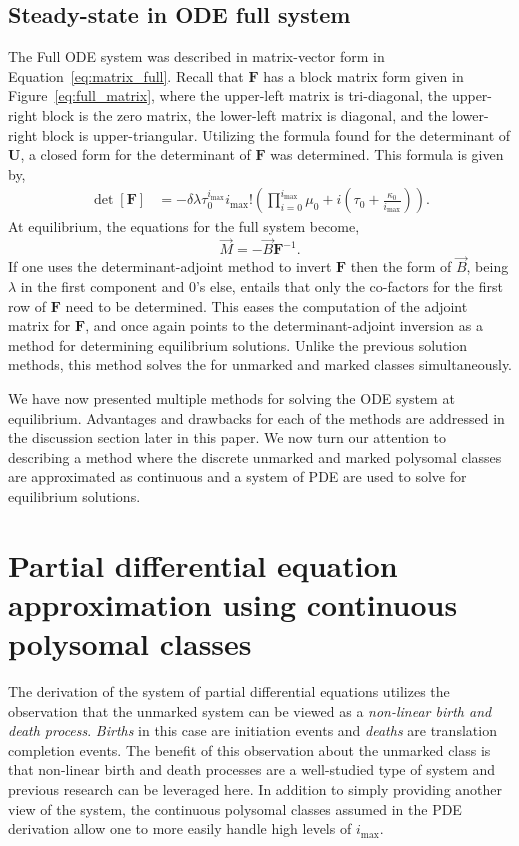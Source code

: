 \documentclass[review]{elsarticle}
\newcommand{\imax}{\ensuremath{i_{\max}}\xspace}
\let\bs\boldsymbol
\begin{document}
\subsection{Steady-state in ODE full system}
The Full ODE system was described in matrix-vector form in Equation~\ref{eq:matrix_full}.
Recall that $\bs{F}$ has a block matrix form given in Figure~\ref{eq:full_matrix}, where the upper-left matrix is tri-diagonal, the upper-right block is the zero matrix, the lower-left matrix is diagonal, and the lower-right block is upper-triangular.
Utilizing the formula found for the determinant of $\bs{U}$, a closed form for the determinant of $\bs{F}$ was determined.
This formula is given by,
\begin{align}
  \label{eq:full_matrix_det}
  \det[\bs{F}] %
            &=-\delta \lambda \tau_0^{\imax}\imax!\left(\prod_{i=0}^{\imax}\mu_0 +i \left(\tau_0 + \frac{\kappa_0}{\imax}\right)\right).
\end{align}
At equilibrium, the equations for the full system become,
\begin{equation}
\vec{M}=-\vec{B}\bs{F}^{-1}.
\end{equation}
If one uses the determinant-adjoint method to invert $\bs{F}$ then the form of $\vec{B}$, being $\lambda$ in the first component and 0's else, entails that only the co-factors for the first row of $\bs{F}$ need to be determined.
This eases the computation of the adjoint matrix for $\bs{F}$, and once again points to the determinant-adjoint inversion as a method for determining equilibrium solutions.
Unlike the previous solution methods, this method solves the for unmarked and marked classes simultaneously.

We have now presented multiple methods for solving the ODE system at equilibrium.
Advantages and drawbacks for each of the methods are addressed in the discussion section later in this paper.
We now turn our attention to describing a method where the discrete unmarked and marked polysomal classes are approximated as continuous and a system of PDE are used to solve for equilibrium solutions.

\section{Partial differential equation approximation using continuous polysomal classes}
The derivation of the system of partial differential equations utilizes the observation that the unmarked system can be viewed as a \emph{non-linear birth and death process}. \emph{Births} in this case are initiation events and \emph{deaths} are translation completion events.
The benefit of this observation about the unmarked class is that non-linear birth and death processes are a well-studied type of system and previous research can be leveraged here.
In addition to simply providing another view of the system, the continuous polysomal classes assumed in the PDE derivation allow one to more easily handle high levels of \imax.
\end{document}
